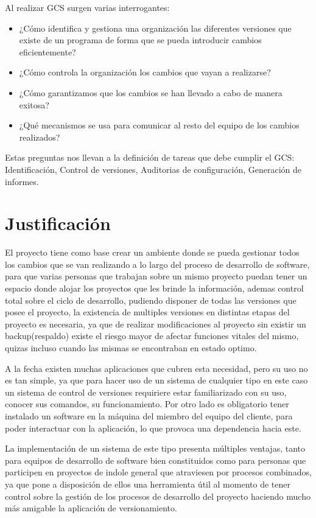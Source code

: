 \documentclass[letterpaper,11pt]{article}
\begin{document}
Al realizar GCS surgen varias interrogantes:
\begin{itemize}
\item ¿Cómo identifica y gestiona una organización las diferentes versiones que existe de un programa de forma que se pueda introducir cambios eficientemente?
\item ¿Cómo controla la organización los cambios que vayan a realizarse?
\item ¿Cómo garantizamos que los cambios se han llevado a cabo de manera exitosa?
\item ¿Qué mecanismos se usa para comunicar al resto del equipo de los cambios realizados?
\end{itemize}
Estas preguntas nos llevan a la definición de tareas que debe cumplir el GCS: Identificación, Control de versiones, Auditorias de configuración, Generación de informes.

\section{Justificación}
El proyecto tiene como base crear un ambiente donde se pueda gestionar todos los cambios que se van realizando a lo largo del proceso de desarrollo de software, para que varias personas que trabajan sobre un mismo proyecto puedan tener un espacio donde alojar los proyectos que les brinde la información, ademas control total sobre el ciclo de desarrollo, pudiendo disponer de todas las versiones que posee el proyecto, la existencia de multiples versiones en distintas etapas del proyecto es necesaria, ya que de realizar modificaciones al proyecto sin existir un backup(respaldo) existe el riesgo mayor de afectar funciones vitales del mismo, quizas incluso cuando las mismas se encontraban en estado optimo.

A la fecha existen muchas aplicaciones que cubren esta necesidad, pero su uso no es tan simple, ya que para hacer uso de un sistema de cualquier tipo en este caso un sistema de control de versiones requiriere estar familiarizado con su uso, conocer sus comandos, su funcionamiento. Por otro lado es obligatorio tener instalado un software en la máquina del miembro del equipo del cliente, para poder interactuar con la aplicación, lo que provoca una dependencia hacia este.

La implementación de un sistema de este tipo presenta múltiples ventajas, tanto para equipos de desarrollo de software bien constituidos como para personas que participen en proyectos de indole general que atraviesen por procesos combinados, ya que pone a disposición de ellos una herramienta útil al momento de tener control sobre la gestión de los procesos de desarrollo del proyecto haciendo mucho más amigable la aplicación de versionamiento.
\end{document}
